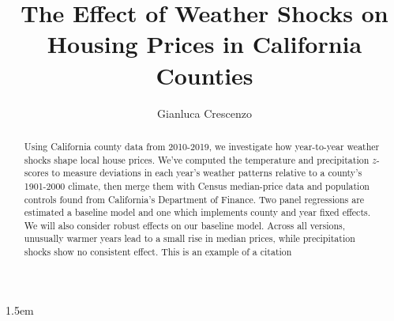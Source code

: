 \documentclass[12pt,reqno]{amsart}
\theoremstyle{definition}
\begin{document}
\parindent1.5em
\setlength\parskip{.1em}
\thispagestyle{empty}
\title{The Effect of Weather Shocks on Housing Prices in California Counties}
\author[Gianluca Crescenzo]{Gianluca Crescenzo}

\begin{abstract}
Using California county data from 2010-2019, we investigate how year-to-year weather shocks shape local house prices. We've computed the temperature and precipitation $z$-scores to measure deviations in each year's weather patterns relative to a county's 1901-2000 climate, then merge them with Census median-price data and population controls found from California's Department of Finance. Two panel regressions are estimated \textemdash a baseline model and one which implements county and year fixed effects. We will also consider robust effects on our baseline model. Across all versions, unusually warmer years lead to a small rise in median prices, while precipitation shocks show no consistent effect. This is an example of a citation \cite{MR4117738}
\end{abstract}

\maketitle
\end{document}
